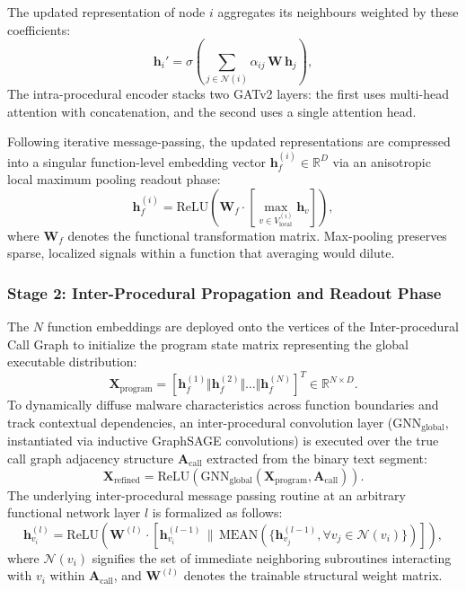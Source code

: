 \documentclass[conference]{IEEEtran}
\begin{document}
The updated representation of node $i$ aggregates its neighbours weighted by these
coefficients:
\begin{equation}
\mathbf{h}_{i}' = \sigma\!\left( \sum_{j \in \mathcal{N}(i)} \alpha_{ij}\, \mathbf{W}\, \mathbf{h}_{j} \right),
\end{equation}
The intra-procedural encoder stacks two GATv2 layers: the first uses multi-head attention with
concatenation, and the second uses a single attention head.

Following iterative message-passing, the updated representations are compressed into a singular function-level embedding vector $\mathbf{h}_{f}^{(i)} \in \mathbb{R}^{D}$ via an anisotropic local maximum pooling readout phase:
\begin{equation}
\mathbf{h}_{f}^{(i)} = \mathrm{ReLU}\left(\mathbf{W}_{f} \cdot \left[ \max_{v \in V_{\text{local}}^{(i)}} \mathbf{h}_{v} \right] \right),
\end{equation}
where $\mathbf{W}_{f}$ denotes the functional transformation matrix. Max-pooling preserves sparse, localized signals within a function that averaging would dilute.

\subsubsection{Stage 2: Inter-Procedural Propagation and Readout Phase}
The $N$ function embeddings are deployed onto the vertices of the Inter-procedural Call Graph to initialize the program state matrix representing the global executable distribution:
\begin{equation}
\mathbf{X}_{\text{program}} = \left[ \mathbf{h}_{f}^{(1)} \Vert \mathbf{h}_{f}^{(2)} \Vert \dots \Vert \mathbf{h}_{f}^{(N)} \right]^{T} \in \mathbb{R}^{N \times D}.
\end{equation}
To dynamically diffuse malware characteristics across function boundaries and track contextual dependencies, an inter-procedural convolution layer ($\text{GNN}_{\text{global}}$, instantiated via inductive GraphSAGE convolutions) is executed over the true call graph adjacency structure $\mathbf{A}_{\text{call}}$ extracted from the binary text segment:
\begin{equation}
\mathbf{X}_{\text{refined}} = \mathrm{ReLU}\left( \text{GNN}_{\text{global}}(\mathbf{X}_{\text{program}}, \mathbf{A}_{\text{call}}) \right).
\end{equation}
The underlying inter-procedural message passing routine at an arbitrary functional network layer $l$ is formalized as follows:
\begin{equation}
\mathbf{h}_{v_i}^{(l)} = \text{ReLU} \left( \mathbf{W}^{(l)} \cdot \left[ \mathbf{h}_{v_i}^{(l-1)} \,\|\, \text{MEAN} \left( \{ \mathbf{h}_{v_j}^{(l-1)}, \forall v_j \in \mathcal{N}(v_i) \} \right) \right] \right),
\end{equation}
where $\mathcal{N}(v_i)$ signifies the set of immediate neighboring subroutines interacting with $v_i$ within $\mathbf{A}_{\text{call}}$, and $\mathbf{W}^{(l)}$ denotes the trainable structural weight matrix.
\end{document}
